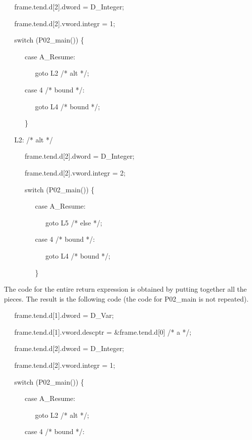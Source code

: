 {\ttfamily\mdseries
\ \ \ frame.tend.d[2].dword = D\_Integer;}

{\ttfamily\mdseries
\ \ \ frame.tend.d[2].vword.integr = 1;}

{\ttfamily\mdseries
\ \ \ switch (P02\_main()) \{}

{\ttfamily\mdseries
\ \ \ \ \ \ case A\_Resume:}

{\ttfamily\mdseries
\ \ \ \ \ \ \ \ \ goto L2 /* alt */;}

{\ttfamily\mdseries
\ \ \ \ \ \ case 4 /* bound */:}

{\ttfamily\mdseries
\ \ \ \ \ \ \ \ \ goto L4 /* bound */;}

{\ttfamily\mdseries
\ \ \ \ \ \ \}}

{\ttfamily\mdseries
\ \ \ L2: /* alt */}

{\ttfamily\mdseries
\ \ \ \ \ \ frame.tend.d[2].dword = D\_Integer;}

{\ttfamily\mdseries
\ \ \ \ \ \ frame.tend.d[2].vword.integr = 2;}

{\ttfamily\mdseries
\ \ \ \ \ \ switch (P02\_main()) \{}

{\ttfamily\mdseries
\ \ \ \ \ \ \ \ \ case A\_Resume:}

{\ttfamily\mdseries
\ \ \ \ \ \ \ \ \ \ \ \ goto L5 /* else */;}

{\ttfamily\mdseries
\ \ \ \ \ \ \ \ \ case 4 /* bound */:}

{\ttfamily\mdseries
\ \ \ \ \ \ \ \ \ \ \ \ goto L4 /* bound */;}

{\ttfamily\mdseries
\ \ \ \ \ \ \ \ \ \}}


The code for the entire return expression is obtained by putting
together all the pieces. The result is the following code (the code
for P02\_main is not repeated).

{\ttfamily\mdseries
\ \ \ frame.tend.d[1].dword = D\_Var;}

{\ttfamily\mdseries
\ \ \ frame.tend.d[1].vword.descptr = \&frame.tend.d[0] /* a */;}

{\ttfamily\mdseries
\ \ \ frame.tend.d[2].dword = D\_Integer;}

{\ttfamily\mdseries
\ \ \ frame.tend.d[2].vword.integr = 1;}

{\ttfamily\mdseries
\ \ \ switch (P02\_main()) \{}

{\ttfamily\mdseries
\ \ \ \ \ \ case A\_Resume:}

{\ttfamily\mdseries
\ \ \ \ \ \ \ \ \ goto L2 /* alt */;}

{\ttfamily\mdseries
\ \ \ \ \ \ case 4 /* bound */:}


